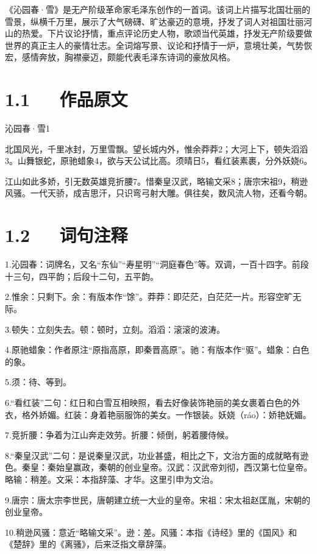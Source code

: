 \documentclass[letterpaper,10pt,english]{sphinxmanual}
\begin{document}
《沁园春·雪》是无产阶级革命家毛泽东创作的一首词。该词上片描写北国壮丽的雪景，纵横千万里，展示了大气磅礴、旷达豪迈的意境，抒发了词人对祖国壮丽河山的热爱。下片议论抒情，重点评论历史人物，歌颂当代英雄，抒发无产阶级要做世界的真正主人的豪情壮志。全词熔写景、议论和抒情于一炉，意境壮美，气势恢宏，感情奔放，胸襟豪迈，颇能代表毛泽东诗词的豪放风格。


\section{1.1   作品原文}
\label{\detokenize{p01_u6563_u6587/_u6bdb_u6cfd_u4e1c-_u6c81_u56ed_u6625_xb7_u96ea:id3}}
沁园春·雪1

北国风光，千里冰封，万里雪飘。望长城内外，惟余莽莽2；大河上下，顿失滔滔3。山舞银蛇，原驰蜡象4，欲与天公试比高。须晴日5，看红装素裹，分外妖娆6。

江山如此多娇，引无数英雄竞折腰7。惜秦皇汉武，略输文采8；唐宗宋祖9，稍逊风骚。一代天骄，成吉思汗，只识弯弓射大雕。俱往矣，数风流人物，还看今朝。


\section{1.2   词句注释}
\label{\detokenize{p01_u6563_u6587/_u6bdb_u6cfd_u4e1c-_u6c81_u56ed_u6625_xb7_u96ea:id4}}
1.沁园春：词牌名，又名“东仙”“寿星明”“洞庭春色”等。双调，一百十四字。前段十三句，四平韵；后段十二句，五平韵。

2.惟余：只剩下。余：有版本作“馀”。莽莽：即茫茫，白茫茫一片。形容空旷无际。

3.顿失：立刻失去。顿：顿时，立刻。滔滔：滚滚的波涛。

4.原驰蜡象：作者原注“原指高原，即秦晋高原”。驰：有版本作“驱”。蜡象：白色的象。

5.须：待、等到。

6.“看红装”二句：红日和白雪互相映照，看去好像装饰艳丽的美女裹着白色的外衣，格外娇媚。红装：身着艳丽服饰的美女。一作银装。妖娆（ráo）：娇艳妩媚。

7.竞折腰：争着为江山奔走效劳。折腰：倾倒，躬着腰侍候。

8.“秦皇汉武”二句：是说秦皇汉武，功业甚盛，相比之下，文治方面的成就略有逊色。秦皇：秦始皇赢政，秦朝的创业皇帝。汉武：汉武帝刘彻，西汉第七位皇帝。略输：稍差。文采：本指辞藻、才华。这里引申为文治。

9.唐宗：唐太宗李世民，唐朝建立统一大业的皇帝。宋祖：宋太祖赵匡胤，宋朝的创业皇帝。

10.稍逊风骚：意近“略输文采”。逊：差。风骚：本指《诗经》里的《国风》和《楚辞》里的《离骚》，后来泛指文章辞藻。
\end{document}
